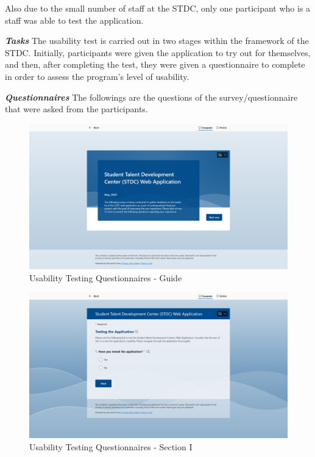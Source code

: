 \begin{justify}
\vspace{0.25cm}
\newendline Also due to the small number of staff at the STDC, only one participant who is a staff was able to test the application.


\newendline \textbf{\textit{Tasks}}\newendline
The usability test is carried out in two stages within the framework of the STDC. Initially, participants were given the application to try out for themselves, and then, after completing the test, they were given a questionnaire to complete in order to assess the program's level of usability.


\newendline \textbf{\textit{Questionnaires}}\newendline
The followings are the questions of the survey/questionnaire that were asked from the participants.

\begin{figure}[H]
    \centerline{\includegraphics[width=150mm,scale=1]{figures/implementation_and_testing/testing/MUT/questions/Questions (1).png}}
    \caption{Usability Testing Questionnaires - Guide}
    \label{Usability Testing Questionnaires - Guide}
\end{figure}

\begin{figure}[H]
    \centerline{\includegraphics[width=150mm,scale=1]{figures/implementation_and_testing/testing/MUT/questions/Questions (2).png}}
    \caption{Usability Testing Questionnaires - Section I}
    \label{Usability Testing Questionnaires - Section I}
\end{figure}


\end{justify}
